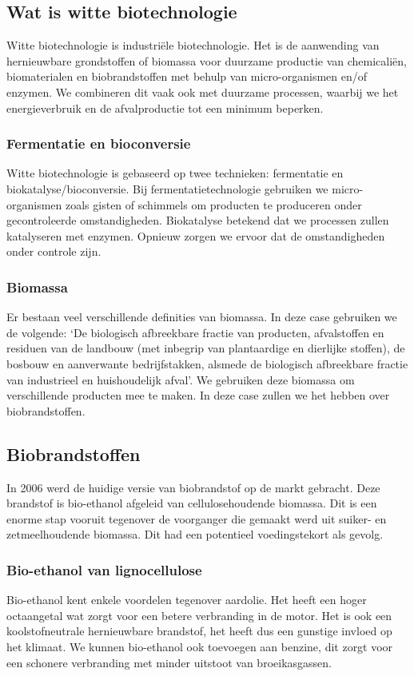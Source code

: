 \documentclass[a4paper,kul]{kulakarticle} %
\begin{document}
\subsection{Wat is witte biotechnologie}
Witte biotechnologie is industriële biotechnologie. Het is de aanwending van hernieuwbare grondstoffen of biomassa voor duurzame productie van chemicaliën, biomaterialen en biobrandstoffen met behulp van micro-organismen en/of enzymen. We combineren dit vaak ook met duurzame processen, waarbij we het energieverbruik en de afvalproductie tot een minimum beperken. 
\subsubsection{Fermentatie en bioconversie}
Witte biotechnologie is gebaseerd op twee technieken: fermentatie en biokatalyse/bioconversie. Bij fermentatietechnologie gebruiken we micro-organismen zoals gisten of schimmels om producten te produceren onder gecontroleerde omstandigheden. Biokatalyse betekend dat we processen zullen katalyseren met enzymen. Opnieuw zorgen we ervoor dat de omstandigheden onder controle zijn. 
\subsubsection{Biomassa}
Er bestaan veel verschillende definities van biomassa. In deze case gebruiken we de volgende: `De biologisch afbreekbare fractie van producten, afvalstoffen en residuen van de landbouw (met inbegrip van plantaardige en dierlijke stoffen), de bosbouw en aanverwante bedrijfstakken, alsmede de biologisch afbreekbare fractie van industrieel en huishoudelijk afval'. We gebruiken deze biomassa om verschillende producten mee te maken. In deze case zullen we het hebben over biobrandstoffen. 
\subsection{Biobrandstoffen}
In 2006 werd de huidige versie van biobrandstof op de markt gebracht. Deze brandstof is bio-ethanol afgeleid van cellulosehoudende biomassa. Dit is een enorme stap vooruit tegenover de voorganger die gemaakt werd uit suiker- en zetmeelhoudende biomassa. Dit had een potentieel voedingstekort als gevolg. 
\subsubsection{Bio-ethanol van lignocellulose}
Bio-ethanol kent enkele voordelen tegenover aardolie. Het heeft een hoger octaangetal wat zorgt voor een betere verbranding in de motor. Het is ook een koolstofneutrale hernieuwbare brandstof, het heeft dus een gunstige invloed op het klimaat. We kunnen bio-ethanol ook toevoegen aan benzine, dit zorgt voor een schonere verbranding met minder uitstoot van broeikasgassen.
\end{document}
